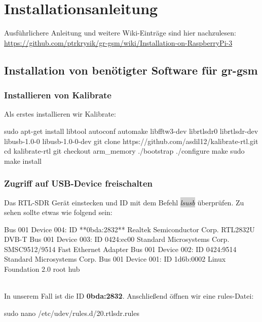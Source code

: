 
\chapter{Installationsanleitung}

Ausführlichere Anleitung und weitere Wiki-Einträge sind hier nachzulesen:\\
\url{https://github.com/ptrkrysik/gr-gsm/wiki/Installation-on-RaspberryPi-3}


\section{Installation von benötigter Software für gr-gsm}

\subsection{Installieren von Kalibrate}

Als erstes installieren wir Kalibrate:

\begin{code}[	numbers=left,stepnumber=1]
sudo apt-get install libtool autoconf automake libfftw3-dev librtlsdr0 librtlsdr-dev libusb-1.0-0 libusb-1.0-0-dev
git clone https://github.com/asdil12/kalibrate-rtl.git
cd kalibrate-rtl
git checkout arm_memory
./bootstrap
./configure
make
sudo make install 
\end{code}

\subsection{Zugriff auf USB-Device freischalten}

Das RTL-SDR Gerät einstecken und ID mit dem Befehl \colorbox{lightgray}{\emph{lsusb}} überprüfen. Zu sehen sollte etwas wie folgend sein:

\begin{code}
Bus 001 Device 004: ID **0bda:2832** Realtek Semiconductor Corp. RTL2832U DVB-T
Bus 001 Device 003: ID 0424:ec00 Standard Microsystems Corp. SMSC9512/9514 Fast Ethernet Adapter
Bus 001 Device 002: ID 0424:9514 Standard Microsystems Corp.
Bus 001 Device 001: ID 1d6b:0002 Linux Foundation 2.0 root hub
\end{code}

\noindent{}\\In unserem Fall ist die ID \textbf{0bda:2832}. Anschließend öffnen wir eine rules-Datei:

\begin{code}
sudo nano /etc/udev/rules.d/20.rtlsdr.rules
\end{code}

